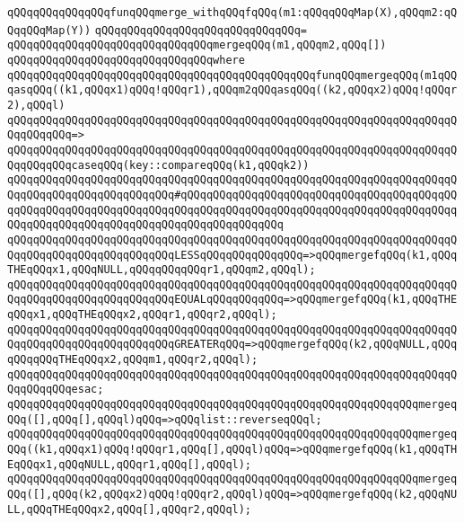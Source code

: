 \verb|qQQqqQQqqQQqqQQqfunqQQqmerge_withqQQqfqQQq(m1:qQQqqQQqMap(X),qQQqm2:qQQqqQQqMap(Y))|\newline
\verb|qQQqqQQqqQQqqQQqqQQqqQQqqQQqqQQq=|\newline
\verb|qQQqqQQqqQQqqQQqqQQqqQQqqQQqqQQqmergeqQQq(m1,qQQqm2,qQQq[])|\newline
\verb|qQQqqQQqqQQqqQQqqQQqqQQqqQQqqQQqwhere|\newline
\verb|qQQqqQQqqQQqqQQqqQQqqQQqqQQqqQQqqQQqqQQqqQQqqQQqfunqQQqmergeqQQq(m1qQQqasqQQq((k1,qQQqx1)qQQq!qQQqr1),qQQqm2qQQqasqQQq((k2,qQQqx2)qQQq!qQQqr2),qQQql)|\newline
\verb|qQQqqQQqqQQqqQQqqQQqqQQqqQQqqQQqqQQqqQQqqQQqqQQqqQQqqQQqqQQqqQQqqQQqqQQqqQQqqQQq=>|\newline
\verb|qQQqqQQqqQQqqQQqqQQqqQQqqQQqqQQqqQQqqQQqqQQqqQQqqQQqqQQqqQQqqQQqqQQqqQQqqQQqqQQqcaseqQQq(key::compareqQQq(k1,qQQqk2))|\newline
\verb|qQQqqQQqqQQqqQQqqQQqqQQqqQQqqQQqqQQqqQQqqQQqqQQqqQQqqQQqqQQqqQQqqQQqqQQqqQQqqQQqqQQqqQQqqQQqqQQq#qQQqqQQqqQQqqQQqqQQqqQQqqQQqqQQqqQQqqQQqqQQqqQQqqQQqqQQqqQQqqQQqqQQqqQQqqQQqqQQqqQQqqQQqqQQqqQQqqQQqqQQqqQQqqQQqqQQqqQQqqQQqqQQqqQQqqQQqqQQqqQQqqQQqqQQqqQQq|\newline
\verb|qQQqqQQqqQQqqQQqqQQqqQQqqQQqqQQqqQQqqQQqqQQqqQQqqQQqqQQqqQQqqQQqqQQqqQQqqQQqqQQqqQQqqQQqqQQqqQQqLESSqQQqqQQqqQQqqQQq=>qQQqmergefqQQq(k1,qQQqTHEqQQqx1,qQQqNULL,qQQqqQQqqQQqr1,qQQqm2,qQQql);|\newline
\verb|qQQqqQQqqQQqqQQqqQQqqQQqqQQqqQQqqQQqqQQqqQQqqQQqqQQqqQQqqQQqqQQqqQQqqQQqqQQqqQQqqQQqqQQqqQQqqQQqEQUALqQQqqQQqqQQq=>qQQqmergefqQQq(k1,qQQqTHEqQQqx1,qQQqTHEqQQqx2,qQQqr1,qQQqr2,qQQql);|\newline
\verb|qQQqqQQqqQQqqQQqqQQqqQQqqQQqqQQqqQQqqQQqqQQqqQQqqQQqqQQqqQQqqQQqqQQqqQQqqQQqqQQqqQQqqQQqqQQqqQQqGREATERqQQq=>qQQqmergefqQQq(k2,qQQqNULL,qQQqqQQqqQQqTHEqQQqx2,qQQqm1,qQQqr2,qQQql);|\newline
\verb|qQQqqQQqqQQqqQQqqQQqqQQqqQQqqQQqqQQqqQQqqQQqqQQqqQQqqQQqqQQqqQQqqQQqqQQqqQQqqQQqesac;|\newline
\newline
\verb|qQQqqQQqqQQqqQQqqQQqqQQqqQQqqQQqqQQqqQQqqQQqqQQqqQQqqQQqqQQqqQQqmergeqQQq([],qQQq[],qQQql)qQQq=>qQQqlist::reverseqQQql;|\newline
\verb|qQQqqQQqqQQqqQQqqQQqqQQqqQQqqQQqqQQqqQQqqQQqqQQqqQQqqQQqqQQqqQQqmergeqQQq((k1,qQQqx1)qQQq!qQQqr1,qQQq[],qQQql)qQQq=>qQQqmergefqQQq(k1,qQQqTHEqQQqx1,qQQqNULL,qQQqr1,qQQq[],qQQql);|\newline
\verb|qQQqqQQqqQQqqQQqqQQqqQQqqQQqqQQqqQQqqQQqqQQqqQQqqQQqqQQqqQQqqQQqmergeqQQq([],qQQq(k2,qQQqx2)qQQq!qQQqr2,qQQql)qQQq=>qQQqmergefqQQq(k2,qQQqNULL,qQQqTHEqQQqx2,qQQq[],qQQqr2,qQQql);|\newline
